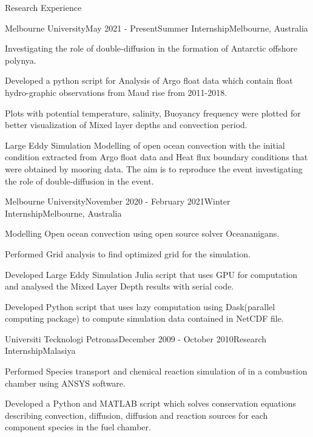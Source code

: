 \documentclass{resume} %
\begin{document}
\begin{rSection}{Research Experience}

\begin{rSubsection}{Melbourne University}{May 2021 - Present}{Summer Internship}{Melbourne, Australia}
\item Investigating the role of double-diffusion in the formation of Antarctic offshore polynya.
\item Developed a python script for Analysis of Argo float data which contain float hydro-graphic observations from Maud rise from 2011-2018. 
\item Plots with potential temperature, salinity, Buoyancy frequency were plotted for better visualization of Mixed layer depths and convection period.
\item Large Eddy Simulation Modelling of open ocean convection with the initial condition extracted from Argo float data and Heat flux boundary conditions that were obtained by mooring data. The aim is to reproduce the event investigating the role of double-diffusion in the event. 
\end{rSubsection}
\begin{rSubsection}{Melbourne University}{November 2020 - February 2021}{Winter Internship}{Melbourne, Australia}
\item Modelling Open ocean convection using open source solver Oceananigans.
\item Performed Grid analysis to find optimized grid for the simulation. 
\item Developed Large Eddy Simulation Julia script that uses GPU for computation and analysed the Mixed Layer Depth results with serial code. 
\item Developed Python script that uses lazy computation using Dask(parallel computing package) to compute simulation data contained in NetCDF file.
 
\end{rSubsection}

\begin{rSubsection}{Universiti Tecknologi Petronas}{December 2009 - October 2010}{Research Internship}{Malasiya}
\item Performed Species transport and chemical reaction simulation of in a combustion chamber using ANSYS software. 
\item Developed a Python and MATLAB script which solves conservation equations describing convection, diffusion, diffusion and reaction sources for each component species in the fuel chamber.
\end{rSubsection}


\end{rSection}
\end{document}
